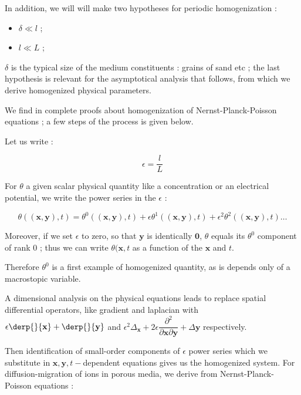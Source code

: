 \par
In addition, we will will make two hypotheses for periodic homogenization :

\begin{itemize}
\item $\delta\ll l$ ;
\item $l\ll L$ ;
\end{itemize}

$\delta$ is the typical size of the medium constituents : grains of sand etc ; %
the last hypothesis is relevant for the asymptotical analysis that follows, %
from which we derive homogenized physical parameters.

\ligneinter
We find in \cite{th_khaledB} complete proofs about homogenization of Nernst-Planck-Poisson equations ; %
a few steps of the process is given below.

\par
Let us write :

\[\epsilon =\frac{l}{L}\]

For $\theta$ a given scalar physical quantity like a concentration or an electrical potential, we write the power series in the $\epsilon$ :

\begin{equation}\label{asyt}
\theta\left((\mathbf{x},\mathbf{y}),t\right)=\theta^0\left((\mathbf{x},\mathbf{y}),t\right)+\epsilon \theta^1\left((\mathbf{x},\mathbf{y}),t\right) +\epsilon^2 \theta^2\left((\mathbf{x},\mathbf{y}),t\right) \dots
\end{equation}

Moreover, if we set $\epsilon$ to zero, so that $\mathbf{y}$ is identically $\mathbf{0}$, %
$\theta$ equals its $\theta^0$ component of rank $0$ ; %
thus we can write $\theta(\mathbf{x},t$ as a function of the $\mathbf{x}$ and $t$.

\par
Therefore $\theta^0$ is a first example of homogenized quantity, as is depends only of a macrostopic variable.

\par
A dimensional analysis on the physical equations leads to replace spatial differential operators, like gradient and laplacian with %
$\epsilon\derp{}{\mathbf{x}}+\derp{}{\mathbf{y}}$ and $\epsilon^2\Delta_{\mathbf{x}}+2\epsilon \dfrac{\partial^2}{\partial{\mathbf{x}}\partial{\mathbf{y}}} +\Delta{\mathbf{y}}$ respectively.

\par
Then identification of small-order components of $\epsilon$ power series which we substitute in $\mathbf{x},\mathbf{y},t-$dependent equations gives us the homogenized system. %
For diffusion-migration of ions in porous media, we derive from Nernst-Planck-Poisson equations :

